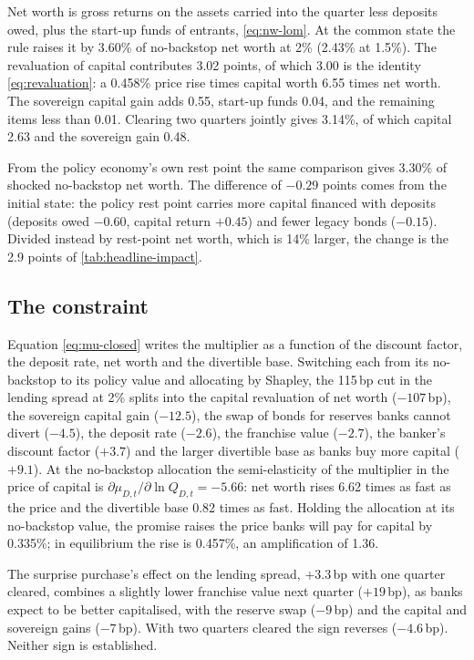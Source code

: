 Net worth is gross returns on the assets carried into the quarter less deposits owed, plus the
start-up funds of entrants, \eqref{eq:nw-lom}. At the common state the rule raises it by 3.60\%
of no-backstop net worth at 2\% (2.43\% at 1.5\%). The revaluation of capital contributes
3.02 points, of which 3.00 is the identity \eqref{eq:revaluation}: a 0.458\% price rise times
capital worth 6.55 times net worth. The sovereign capital gain adds 0.55, start-up funds 0.04,
and the remaining items less than 0.01. Clearing two quarters jointly gives 3.14\%, of which
capital 2.63 and the sovereign gain 0.48.

From the policy economy's own rest point the same comparison gives 3.30\% of shocked
no-backstop net worth. The difference of $-0.29$ points comes from the initial state: the policy
rest point carries more capital financed with deposits (deposits owed $-0.60$, capital return
$+0.45$) and fewer legacy bonds ($-0.15$). Divided instead by rest-point net worth, which is 14\%
larger, the change is the 2.9 points of \cref{tab:headline-impact}.

\subsection{The constraint}
\label{app:mech-constraint}

Equation \eqref{eq:mu-closed} writes the multiplier as a function of the discount factor, the
deposit rate, net worth and the divertible base. Switching each from its no-backstop to its
policy value and allocating by Shapley, the 115\,bp cut in the lending spread at 2\% splits into
the capital revaluation of net worth ($-107$\,bp), the sovereign capital gain ($-12.5$), the swap
of bonds for reserves banks cannot divert ($-4.5$), the deposit rate ($-2.6$), the franchise
value ($-2.7$), the banker's discount factor ($+3.7$) and the larger divertible base as banks buy
more capital ($+9.1$). At the no-backstop allocation the semi-elasticity of the multiplier in the
price of capital is $\partial\mu_{D,t}/\partial\ln Q_{D,t}=-5.66$: net worth rises 6.62 times as
fast as the price and the divertible base 0.82 times as fast. Holding the allocation at its
no-backstop value, the promise raises the price banks will pay for capital by 0.335\%; in
equilibrium the rise is 0.457\%, an amplification of 1.36.

The surprise purchase's effect on the lending spread, $+3.3$\,bp with one quarter cleared,
combines a slightly lower franchise value next quarter ($+19$\,bp), as banks expect to be better
capitalised, with the reserve swap ($-9$\,bp) and the capital and sovereign gains ($-7$\,bp). With
two quarters cleared the sign reverses ($-4.6$\,bp). Neither sign is established.
